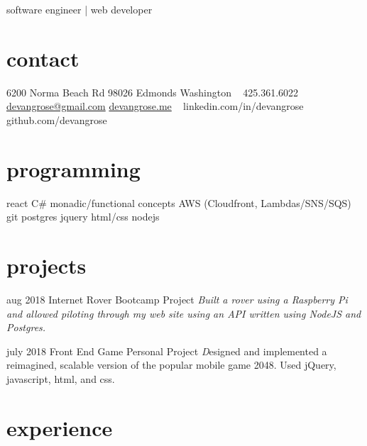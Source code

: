 \documentclass[]{friggeri-cv}
\begin{document}
       { software engineer | web developer }




\begin{aside}
  \section{contact}
    6200 Norma Beach Rd
    98026 Edmonds
    Washington
    ~
    425.361.6022
    \href{mailto:devangrose@gmail.com}{devangrose@gmail.com}
    \href{http://devangrose.me}{devangrose.me}
    ~
    linkedin.com/in/devangrose
    github.com/devangrose
  \section{programming}
    react
    C#
    monadic/functional concepts
    AWS (Cloudfront, Lambdas/SNS/SQS)
    git
    postgres
    jquery
    html/css
    nodejs

\end{aside}


\section{projects}

\begin{entrylist}

  \entry
    {aug 2018}
    {Internet Rover}
    {Bootcamp Project}
    {\emph{Built a rover using a Raspberry Pi and allowed piloting through my web site using an API written using NodeJS and Postgres.}}

  \entry
    {july 2018}
    {Front End Game}
    {Personal Project}
    {\emph Designed and implemented a reimagined, scalable version of the popular mobile game 2048. Used jQuery, javascript, html, and css.}

\end{entrylist}

\section{experience}
\end{document}
